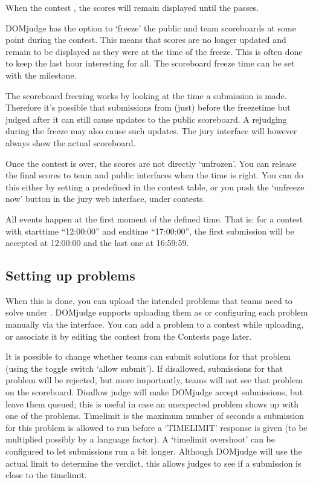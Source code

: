 \documentclass[a4paper,10pt,english,openany]{sphinxmanual}
\begin{document}
\sphinxAtStartPar
When the contest , the scores will remain displayed until the
 passes.

\sphinxAtStartPar
DOMjudge has the option to ‘freeze’ the public and team scoreboards
at some point during the contest. This means that scores are no longer
updated and remain to be displayed as they were at the time of the
freeze. This is often done to keep the last hour interesting for all.
The scoreboard freeze time can be set with the  milestone.

\sphinxAtStartPar
The scoreboard freezing works by looking at the time a submission is
made. Therefore it’s possible that submissions from (just) before the
freezetime but judged after it can still cause updates to the public
scoreboard. A rejudging during the freeze may also cause such updates.
The jury interface will however always show the actual
scoreboard.

\sphinxAtStartPar
Once the contest is over, the scores are not directly ‘unfrozen’.
You can release the final scores to team and public interfaces when the
time is right. You can do this either by setting a predefined
 in the contest table, or you push the ‘unfreeze
now’ button in the jury web interface, under contests.

\sphinxAtStartPar
All events happen at the first moment of the defined time. That is:
for a contest with starttime “12:00:00” and endtime “17:00:00”, the
first submission will be accepted at 12:00:00 and the last one at
16:59:59.


\subsection{Setting up problems}
\label{\detokenize{config-basic:setting-up-problems}}
\sphinxAtStartPar
When this is done, you can upload the intended
problems that teams need to solve under . DOMjudge supports
uploading them as {\hyperref[\detokenize{problem-format::doc}]{}} or configuring
each problem manually via the interface. You can add a problem to a
contest while uploading, or associate it by editing the contest
from the Contests page later.

\sphinxAtStartPar
It is possible to change whether teams can submit solutions for that
problem (using the toggle switch ‘allow submit’). If disallowed,
submissions for that problem will be rejected, but more importantly,
teams will not see that problem on the scoreboard. Disallow judge
will make DOMjudge accept submissions, but leave them queued; this
is useful in case an unexpected problem shows up with one of the
problems. Timelimit is the maximum number of seconds a submission
for this problem is allowed to run before a ‘TIMELIMIT’ response
is given (to be multiplied possibly by a language factor). A
‘timelimit overshoot’ can be configured to let submissions run a
bit longer. Although DOMjudge will use the actual limit to
determine the verdict, this allows judges to see if a submission
is close to the timelimit.
\end{document}
